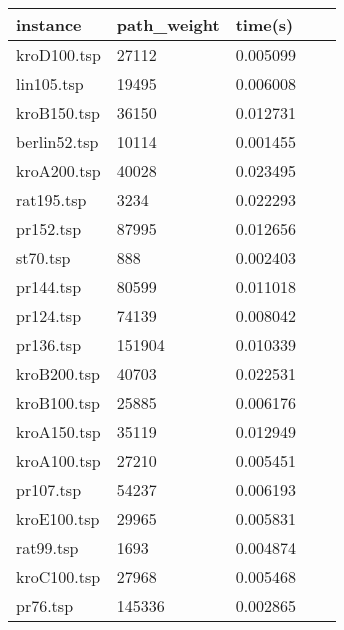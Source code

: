 \documentclass{article}
\begin{document}
\begin{center}
	\begin{tabular}{lllrr}
		\toprule
        instance     & path\_weight & time(s)    \\
		\midrule
		kroD100.tsp  & 27112        & 0.005099 \\
		lin105.tsp   & 19495        & 0.006008 \\
		kroB150.tsp  & 36150        & 0.012731 \\
		berlin52.tsp & 10114        & 0.001455 \\
		kroA200.tsp  & 40028        & 0.023495 \\
		rat195.tsp   & 3234         & 0.022293 \\
		pr152.tsp    & 87995        & 0.012656 \\
		st70.tsp     & 888          & 0.002403 \\
		pr144.tsp    & 80599        & 0.011018 \\
		pr124.tsp    & 74139        & 0.008042 \\
		pr136.tsp    & 151904       & 0.010339 \\
		kroB200.tsp  & 40703        & 0.022531 \\
		kroB100.tsp  & 25885        & 0.006176 \\
		kroA150.tsp  & 35119        & 0.012949 \\
		kroA100.tsp  & 27210        & 0.005451 \\
		pr107.tsp    & 54237        & 0.006193 \\
		kroE100.tsp  & 29965        & 0.005831 \\
		rat99.tsp    & 1693         & 0.004874 \\
		kroC100.tsp  & 27968        & 0.005468 \\
		pr76.tsp     & 145336       & 0.002865 \\
		\bottomrule
	\end{tabular}
\end{center}
\end{document}
